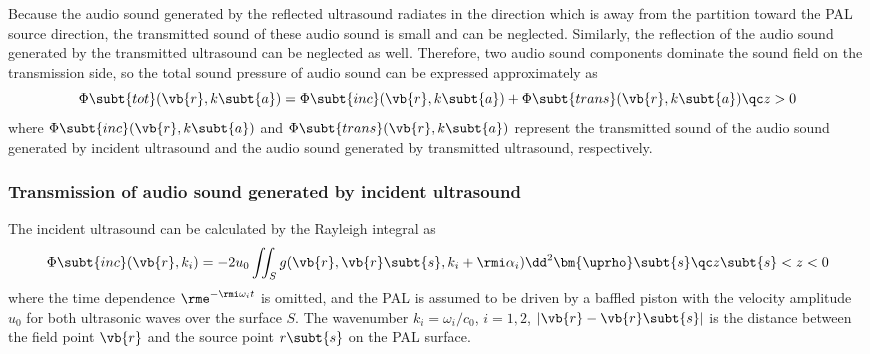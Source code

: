 Because the audio sound generated by the reflected ultrasound radiates in the direction which is away from the partition toward the PAL source direction, the transmitted sound of these audio sound is small and can be neglected.
Similarly, the reflection of the audio sound generated by the
transmitted ultrasound can be neglected as well. Therefore,
two audio sound components dominate the sound field on
the transmission side, so the total sound pressure of audio
sound can be expressed approximately as
\begin{equation}
    \Phi\subt{tot}(\vb{r},k\subt{a}) = \Phi\subt{inc}(\vb{r},k\subt{a}) + \Phi\subt{trans}(\vb{r}, k\subt{a})\qc
    z>0
\end{equation}
where $\Phi\subt{inc}(\vb{r},k\subt{a})$ and $\Phi\subt{trans}(\vb{r}, k\subt{a})$ represent the transmitted sound
of the audio sound generated by incident ultrasound and
the audio sound generated by transmitted ultrasound,
respectively.

\subsubsection{Transmission of audio sound generated by incident ultrasound}
The incident ultrasound can be calculated by the
Rayleigh integral as
\begin{equation}
    \Phi\subt{inc}(\vb{r},k_i)
    = -2u_0
    \iint_S 
    g(\vb{r},\vb{r}\subt{s}, k_i + \rmi \alpha_i )
    \dd^2 \bm{\uprho}\subt{s}
    \qc
    z\subt{s} < z <0 
\end{equation}
where the time dependence $\rme^{-\rmi \omega_i t}$  is omitted, 
and the PAL is assumed to be driven by a baffled
piston with the velocity amplitude $u_0$ for both ultrasonic
waves over the surface $S$. The wavenumber $k_i=\omega_i/c_0$,
$i = 1,2$, 
$|\vb{r}-\vb{r}\subt{s}|$ is the distance
between the field point $\vb{r}$ and the source point
$r\subt{s}$ on the PAL surface.

